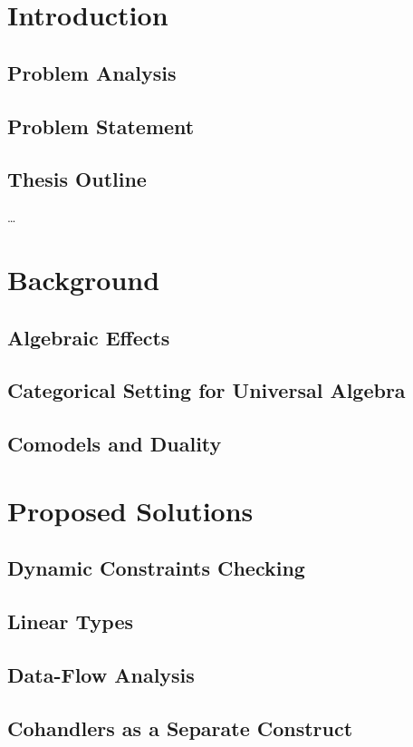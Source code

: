 \documentclass[declaration,shortabstract]{iithesis}
\author         {Mateusz Urbańczyk}
\date           {30 czerwca 2020}                     %
\begin{document}

\chapter{Introduction}
\section{Problem Analysis}
\section{Problem Statement}
\section{Thesis Outline}

\ldots \cite{frank}

\chapter{Background}
\section{Algebraic Effects}
\section{Categorical Setting for Universal Algebra}
\section{Comodels and Duality}

\chapter{Proposed Solutions}
\section{Dynamic Constraints Checking}
\section{Linear Types}
\section{Data-Flow Analysis}
\section{Cohandlers as a Separate Construct}
\end{document}
